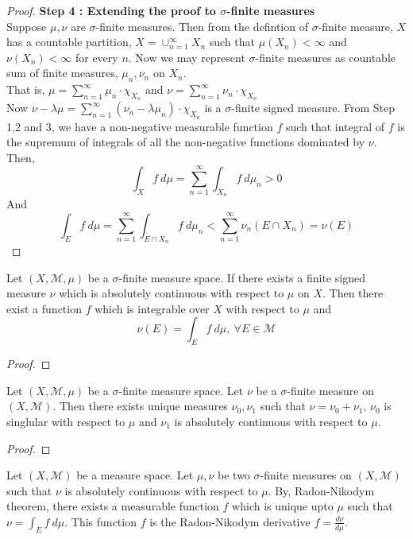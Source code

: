\begin{proof}
	\textbf{Step 4 : Extending the proof to $\sigma$-finite measures}\\
	Suppose $\mu,\nu$ are $\sigma$-finite measures.
	Then from the defintion of $\sigma$-finite measure, $X$ has a countable partition, $X = \cup_{n =1}^\infty X_n$ such that $\mu(X_n) < \infty$ and $\nu(X_n) < \infty$ for every $n$.
	Now we may represent $\sigma$-finite measures as countable sum of finite measures, $\mu_n,\nu_n$ on $X_n$.\\
	That is, $\displaystyle \mu = \sum_{n=1}^\infty \mu_n \cdot \chi_{X_n}$ and $\displaystyle \nu = \sum_{n=1}^\infty \nu_n \cdot \chi_{X_n}$\\
	Now $\displaystyle \nu-\lambda\mu = \sum_{n=1}^\infty (\nu_n - \lambda\mu_n) \cdot \chi_{X_n}$ is a $\sigma$-finite signed measure.
	From Step 1,2 and 3, we have a non-negative measurable function $f$ such that integral of $f$ is the supremum of integrals of all the non-negative functions dominated by $\nu$.
	Then,
	\[ \int_{X} f \ d\mu = \sum_{n=1}^\infty \int_{X_n} f \ d\mu_n > 0 \]
	And
	\[ \int_{E} f \ d\mu = \sum_{n=1}^\infty \int_{E \cap X_n} f \ d\mu_n < \sum_{n=1}^\infty \nu_n(E \cap X_n) = \nu(E) \]
\end{proof}

\begin{theorem}
	Let $(X,\mathcal{M},\mu)$ be a $\sigma$-finite measure space.
	If there exists a finite signed measure $\nu$ which is absolutely continuous with respect to $\mu$ on $X$.
	Then there exist a function $f$ which is integrable over $X$ with respect to $\mu$ and
	\begin{equation}
		\nu(E) = \int_E f \ d\mu,\ \forall E \in \mathcal{M} 
	\end{equation}
\end{theorem}
\begin{proof}
\end{proof}

\begin{theorem}
	Let $(X,\mathcal{M},\mu)$ be a $\sigma$-finite measure space.
	Let $\nu$ be a $\sigma$-finite measure on $(X,\mathcal{M})$.
	Then there exists unique measures $\nu_0,\nu_1$ such that $\nu = \nu_0 + \nu_1$, $\nu_0$ is singlular with respect to $\mu$ and $\nu_1$ is absolutely continuous with respect to $\mu$.
\end{theorem}
\begin{proof}
\end{proof}

\begin{definition}
	Let $(X,\mathcal{M})$ be a measure space.
	Let $\mu,\nu$ be two $\sigma$-finite measures on $(X,\mathcal{M})$ such that $\nu$ is absolutely continuous with respect to $\mu$.
	By, Radon-Nikodym theorem, there exists a measurable function $f$ which is unique upto $\mu$ such that $\nu = \int_E f \ d\mu$.
	This function $f$ is the Radon-Nikodym derivative $f = \frac{d\nu}{d\mu}$.
\end{definition}

